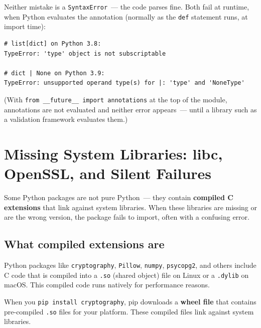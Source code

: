 \noindent{}Neither mistake is a \texttt{SyntaxError}~--- the code parses fine. Both fail at runtime, when Python evaluates the annotation (normally as the \texttt{def} statement runs, at import time):

\begin{outputbox}[short]
\begin{Verbatim}[fontsize=\codesize, breaklines, breakanywhere, breaksymbolleft={\tiny\textcolor{muted}{$\hookrightarrow$}}]
# list[dict] on Python 3.8:
TypeError: 'type' object is not subscriptable

# dict | None on Python 3.9:
TypeError: unsupported operand type(s) for |: 'type' and 'NoneType'
\end{Verbatim}
\end{outputbox}

\noindent{}(With \texttt{from\ \_}\allowbreak{}\texttt{\_}\allowbreak{}\texttt{future\_}\allowbreak{}\texttt{\_}\allowbreak{}\texttt{\ import\ annotations} at the top of the module, annotations are not evaluated and neither error appears~--- until a library such as a validation framework evaluates them.)

\setcounter{section}{3}
\section{Missing System Libraries: libc, OpenSSL, and Silent Failures}\label{07-environment-drift:74-missing-system-libraries-libc-openssl-and-silent-failures}

Some Python packages are not pure Python~--- they contain \textbf{compiled C extensions} that link against system libraries. When these libraries are missing or are the wrong version, the package fails to import, often with a confusing error.

\subsection*{What compiled extensions are}\label{07-environment-drift:what-compiled-extensions-are}

Python packages like \texttt{cryptography}, \texttt{Pillow}, \texttt{numpy}, \texttt{psycopg2}, and others include C code that is compiled into a \texttt{.so} (shared object) file on Linux or a \texttt{.dylib} on macOS. This compiled code runs natively for performance reasons.

When you \texttt{pip\ install\ cryptography}, pip downloads a \textbf{wheel file} that contains pre-compiled \texttt{.so} files for your platform. These compiled files link against system libraries.

